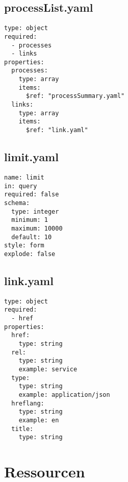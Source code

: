 \subsection{processList.yaml}
\begin{lstlisting}[caption={processList.yaml}]
type: object
required:
  - processes
  - links
properties:
  processes:
    type: array
    items:
      $ref: "processSummary.yaml"
  links:
    type: array
    items:
      $ref: "link.yaml"
\end{lstlisting}\label{appendixprocessListyaml}  

\subsection{limit.yaml}
\begin{lstlisting}[caption={limit.yaml}]
name: limit
in: query
required: false
schema:
  type: integer
  minimum: 1
  maximum: 10000
  default: 10
style: form
explode: false
\end{lstlisting}\label{appendixlimityaml}  

\subsection{link.yaml}
\begin{lstlisting}[caption={link.yaml}]
type: object
required:
  - href
properties:
  href:
    type: string
  rel:
    type: string
    example: service
  type:
    type: string
    example: application/json
  hreflang:
    type: string
    example: en
  title:
    type: string
\end{lstlisting}\label{appendixlinkyaml}  

\section{Ressourcen}
\renewcommand{\lstlistingname}{Ressource}

